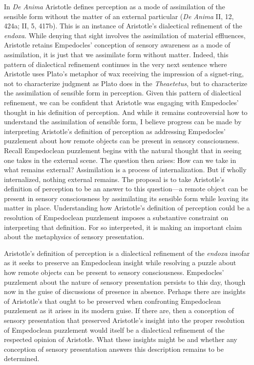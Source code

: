 \documentclass[12pt]{article}
\begin{document}
In \emph{De Anima} Aristotle defines perception as a mode of assimilation of the sensible form without the matter of an external particular (\emph{De Anima} II, 12, 424a; II, 5, 417b). This is an instance of Aristotle's dialectical refinement of the \emph{endoxa}. While denying that sight involves the assimilation of material effluences, Aristotle retains Empedocles' conception of sensory awareness as a mode of assimilation, it is just that we assimilate form without matter. Indeed, this pattern of dialectical refinement continues in the very next sentence where Aristotle uses Plato's metaphor of  wax receiving the impression of a signet-ring, not to characterize judgment as Plato does in the \emph{Theaetetus}, but to characterize the assimilation of sensible form in perception. Given this pattern of dialectical refinement, we can be confident that Aristotle was engaging with Empedocles' thought in his definition of perception. And while it remains controversial how to understand the assimilation of sensible form, I believe progress can be made by interpreting Aristotle's definition of perception as addressing Empedocles' puzzlement about how remote objects can be present in sensory consciousness. Recall Empedoclean puzzlement begins with the natural thought that in seeing one takes in the external scene. The question then arises: How can we take in what remains external? Assimilation is a process of internalization. But if wholly internalized, nothing external remains. The proposal is to take Aristotle's definition of perception to be an answer to this question---a remote object can be present in sensory consciousness by assimilating its sensible form while leaving its matter in place. Understanding how Aristotle's definition of perception could be a resolution of Empedoclean puzzlement imposes a substantive constraint on interpreting that definition. For so interpreted, it is making an important claim about the metaphysics of sensory presentation.

Aristotle's definition of perception is a dialectical refinement of the \emph{endoxa} insofar as it seeks to preserve an Empedoclean insight while resolving a puzzle about how remote objects can be present to sensory consciousness. Empedocles' puzzlement about the nature of sensory presentation persists to this day, though now in the guise of discussions of presence in absence. Perhaps there are insights of Aristotle's that ought to be preserved when confronting Empedoclean puzzlement as it arises in its modern guise. If there are, then a conception of sensory presentation that preserved Aristotle's insight into the proper resolution of Empedoclean puzzlement would itself be a dialectical refinement of the respected opinion of Aristotle. What these insights might be and whether any conception of sensory presentation answers this description remains to be determined.
\end{document}
